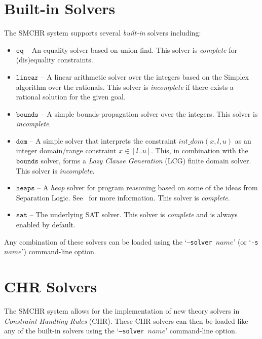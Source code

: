 \documentclass{article}
\begin{document}
\section{Built-in Solvers} \label{sec:builtin}

The SMCHR system supports several \emph{built-in} solvers including:
\begin{itemize}[noitemsep,topsep=0pt,parsep=0pt,partopsep=0pt]
    \item $\mathtt{eq}$ -- An equality solver based on union-find.
    This solver is \emph{complete} for (dis)equality constraints.
    \item $\mathtt{linear}$ -- A linear arithmetic solver over the integers
    based on the Simplex algorithm over the rationals.
    This solver is \emph{incomplete} if there exists a rational solution
    for the given goal.
    \item $\mathtt{bounds}$ -- A simple bounds-propagation solver over the
    integers.
    This solver is \emph{incomplete}.
    \item $\mathtt{dom}$ -- A simple solver that interprets the constraint
    $\mathit{int\_dom}(x, l, u)$ as an integer domain/range constraint
    $x \in [l..u]$.
    This, in combination with the $\mathtt{bounds}$ solver, forms a
    \emph{Lazy Clause Generation} (LCG) finite domain solver.
    This solver is \emph{incomplete}.
    \item $\mathtt{heaps}$ -- A \emph{heap} solver for program
    reasoning based on some of the ideas from Separation Logic.
    See~\cite{heaps} for more information.
    This solver is \emph{complete}.
    \item $\mathtt{sat}$ -- The underlying SAT solver.
    This solver is \emph{complete} and is always enabled by default.
\end{itemize}
Any combination of these solvers can be loaded using the 
`\texttt{--solver $name$}' (or `\texttt{-s $name$}') command-line option.

\section{CHR Solvers} \label{sec:chr}

The SMCHR system allows for the implementation of new theory solvers in
\emph{Constraint Handling Rules} (CHR).
These CHR solvers can then be loaded like any of the built-in solvers
using the `\texttt{--solver $name$}' command-line option.
\end{document}
